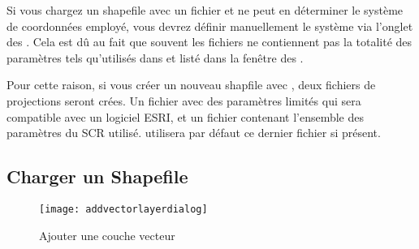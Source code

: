

Si vous chargez un shapefile avec un fichier  et \qg ne peut en déterminer le système de coordonnées employé, vous devrez définir manuellement le système via l'onglet  des . Cela est dû au fait que souvent les fichiers  ne contiennent pas la totalité des paramètres tels qu'utilisés dans \qg et listé dans la fenêtre des .

Pour cette raison, si vous créer un nouveau shapfile avec \qg, deux fichiers de projections seront crées. Un fichier  avec des paramètres limités qui sera compatible avec un logiciel ESRI, et un fichier  contenant l'ensemble des paramètres du SCR utilisé. \qg utilisera par défaut ce dernier fichier si présent.

\subsection{Charger un Shapefile}\label{sec:load_shapefile}

\begin{figure}[ht]
   \begin{center}  
   \texttt{[image: addvectorlayerdialog]}
   \caption{Ajouter une couche vecteur \nixcaption}\label{fig:addvectorlayer}
\end{center}
\end{figure}

